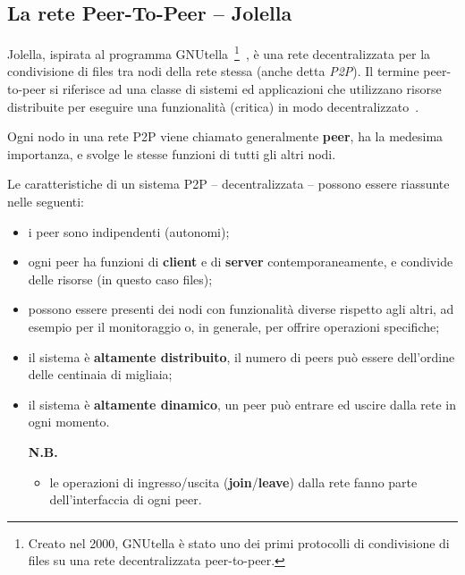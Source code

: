 
\subsection{La rete Peer-To-Peer -- Jolella}
\label{subsec:jolella}

Jolella, ispirata al programma GNUtella~\footnote{Creato nel
 2000, GNUtella è stato uno dei primi protocolli di condivisione di files su una
 rete decentralizzata peer-to-peer.}~\cite{gnutella}, è una rete decentralizzata per la
condivisione di files tra nodi della rete stessa (anche detta \textit{P2P}). Il
termine peer-to-peer si riferisce ad una classe di sistemi ed applicazioni che
utilizzano risorse distribuite per eseguire una funzionalità (critica) in modo
decentralizzato~\cite{peer-to-peer}.

Ogni nodo in una rete P2P viene chiamato generalmente \textbf{peer}, ha la
medesima importanza, e svolge le stesse funzioni di tutti gli altri nodi.

Le caratteristiche di un sistema P2P -- decentralizzata -- possono essere
riassunte nelle seguenti:

\begin{itemize}

 \item i peer sono indipendenti (autonomi);

 \item ogni peer ha funzioni di \textbf{client} e di \textbf{server}
       contemporaneamente, e condivide delle risorse (in questo caso files);

 \item possono essere presenti dei nodi con funzionalità diverse rispetto agli
       altri, ad esempio per il monitoraggio o, in generale, per offrire operazioni
       specifiche;

 \item il sistema è \textbf{altamente distribuito}, il numero di peers può
       essere dell'ordine delle centinaia di migliaia;

 \item il sistema è \textbf{altamente dinamico}, un peer può entrare ed uscire
       dalla rete in ogni momento.

       \textbf{N.B.}

       \begin{itemize}

        \item le operazioni di ingresso/uscita (\textbf{join}/\textbf{leave}) dalla
              rete fanno parte dell'interfaccia di ogni peer.

       \end{itemize}

\end{itemize}

